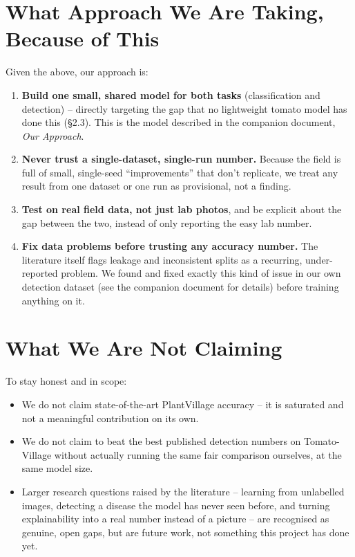 \documentclass[11pt,a4paper]{article}
\begin{document}
\section{What Approach We Are Taking, Because of This}
Given the above, our approach is:
\begin{enumerate}
  \item \textbf{Build one small, shared model for both tasks} (classification and
    detection) -- directly targeting the gap that no lightweight tomato model has done
    this (\S2.3). This is the model described in the companion document, \emph{Our
    Approach}.
  \item \textbf{Never trust a single-dataset, single-run number.} Because the field is
    full of small, single-seed ``improvements'' that don't replicate, we treat any result
    from one dataset or one run as provisional, not a finding.
  \item \textbf{Test on real field data, not just lab photos}, and be explicit about the
    gap between the two, instead of only reporting the easy lab number.
  \item \textbf{Fix data problems before trusting any accuracy number.} The literature
    itself flags leakage and inconsistent splits as a recurring, under-reported problem.
    We found and fixed exactly this kind of issue in our own detection dataset (see the
    companion document for details) before training anything on it.
\end{enumerate}

\section{What We Are Not Claiming}
To stay honest and in scope:
\begin{itemize}
  \item We do not claim state-of-the-art PlantVillage accuracy -- it is saturated and
    not a meaningful contribution on its own.
  \item We do not claim to beat the best published detection numbers on Tomato-Village
    without actually running the same fair comparison ourselves, at the same model size.
  \item Larger research questions raised by the literature -- learning from unlabelled
    images, detecting a disease the model has never seen before, and turning
    explainability into a real number instead of a picture -- are recognised as genuine,
    open gaps, but are future work, not something this project has done yet.
\end{itemize}
\end{document}
